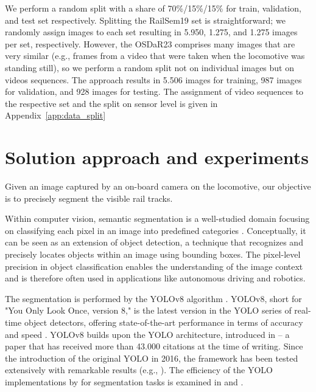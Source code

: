 \documentclass[Master,MDS,english]{BASE/twbook} %
\begin{document}
We perform a random split with a share of 70\%/15\%/15\% for train, validation, and test set respectively. Splitting the RailSem19 set is straightforward; we randomly assign images to each set resulting in 5.950, 1.275, and 1.275 images per set, respectively. However, the OSDaR23 comprises many images that are very similar (e.g., frames from a video that were taken when the locomotive was standing still), so we perform a random split not on individual images but on videos sequences. The approach results in 5.506 images for training, 987 images for validation, and 928 images for testing.
The assignment of video sequences to the respective set and the split on sensor level is given in Appendix~\ref{app:data_split}



\chapter{Solution approach and experiments} %

Given an image captured by an on-board camera on the locomotive, our objective is to precisely segment the visible rail tracks. %

Within computer vision, semantic segmentation is a well-studied domain focusing on classifying each pixel in an image into predefined categories \citep{MO2022626}. Conceptually, it 
can be seen as an extension of object detection, a technique that recognizes and precisely locates objects within an image using bounding boxes.
The pixel-level precision in object classification enables the understanding of the image context and is therefore often used in applications like autonomous driving and robotics.

 The segmentation is performed by the YOLOv8 algorithm \citep{Jocher_Ultralytics_YOLO_2023}.  YOLOv8, short for "You Only Look Once, version 8," is the latest version in the YOLO series of real-time object detectors, offering state-of-the-art performance in terms of accuracy and speed \citep{ultralytics_docs}. YOLOv8 builds upon the YOLO architecture, introduced in \cite{redmon2016you} -- a paper that has received more than 43.000 citations at the time of writing. Since the introduction of the original YOLO in 2016, the framework has been tested extensively with remarkable results (e.g., \cite{JIANG20221066, cryptography6020016, Diwan2023}). The efficiency of the YOLO implementations by \cite{Jocher_Ultralytics_YOLO_2023} for segmentation tasks is examined in \cite{agriculture13081643} and \cite{STRAKER2023100045}.
\end{document}
